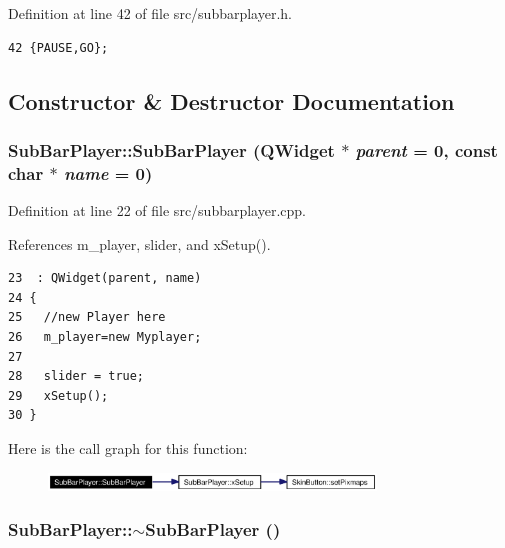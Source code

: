 Definition at line 42 of file src/subbarplayer.h.



\footnotesize\begin{verbatim}42 {PAUSE,GO};
\end{verbatim}\normalsize 


\subsection{Constructor \& Destructor Documentation}
\subsubsection{\setlength{\rightskip}{0pt plus 5cm}Sub\-Bar\-Player::Sub\-Bar\-Player ({\bf QWidget} $\ast$ {\em parent} = 0, const char $\ast$ {\em name} = 0)}\label{classSubBarPlayer_SubBarPlayera0}




Definition at line 22 of file src/subbarplayer.cpp.

References m\_\-player, slider, and x\-Setup().



\footnotesize\begin{verbatim}23  : QWidget(parent, name)
24 {
25   //new Player here
26   m_player=new Myplayer;
27  
28   slider = true;
29   xSetup();
30 }
\end{verbatim}\normalsize 


Here is the call graph for this function:\begin{figure}[H]
\begin{center}
\leavevmode
\includegraphics[width=247pt]{classSubBarPlayer_SubBarPlayera0_cgraph}
\end{center}
\end{figure}
\subsubsection{\setlength{\rightskip}{0pt plus 5cm}Sub\-Bar\-Player::$\sim${\bf Sub\-Bar\-Player} ()}\label{classSubBarPlayer_SubBarPlayera1}




